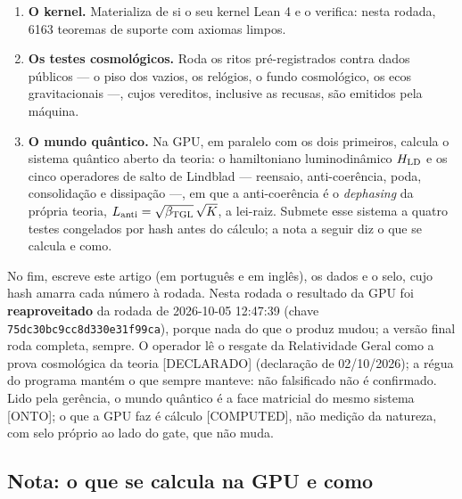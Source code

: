 \documentclass[11pt]{article}
\newcommand{\bTGL}{\beta_{\mathrm{TGL}}}\newcommand{\Msun}{M_{\odot}}\newcommand{\TGL}{\mathrm{TGL}}
\theoremstyle{definition}\newtheorem{deriv}{Derivação}
\begin{document}
\begin{enumerate}

\item \textbf{O kernel.} Materializa de si o seu kernel Lean 4 e o verifica: nesta rodada, 6163 teoremas de suporte com axiomas limpos.

\item \textbf{Os testes cosmológicos.} Roda os ritos pré-registrados contra dados públicos --- o piso dos vazios, os relógios, o fundo cosmológico, os ecos gravitacionais ---, cujos vereditos, inclusive as recusas, são emitidos pela máquina.

\item \textbf{O mundo quântico.} Na GPU, em paralelo com os dois primeiros, calcula o sistema quântico aberto da teoria: o hamiltoniano luminodinâmico $H_{\rm LD}$ e os cinco operadores de salto de Lindblad --- reensaio, anti-coerência, poda, consolidação e dissipação ---, em que a anti-coerência é o \emph{dephasing} da própria teoria, $L_{\rm anti}=\sqrt{\bTGL}\,\sqrt K$, a lei-raiz. Submete esse sistema a quatro testes congelados por hash antes do cálculo; a nota a seguir diz o que se calcula e como.

\end{enumerate}

No fim, escreve este artigo (em português e em inglês), os dados e o selo, cujo hash amarra cada número à rodada. Nesta rodada o resultado da GPU foi \textbf{reaproveitado} da rodada de 2026-10-05 12:47:39 (chave \texttt{75dc30bc9cc8d330e31f99ca}), porque nada do que o produz mudou; a versão final roda completa, sempre. O operador lê o resgate da Relatividade Geral como a prova cosmológica da teoria \textsf{[DECLARADO]} (declaração de 02/10/2026); a régua do programa mantém o que sempre manteve: não falsificado não é confirmado. Lido pela gerência, o mundo quântico é a face matricial do mesmo sistema \textsf{[ONTO]}; o que a GPU faz é cálculo \textsf{[COMPUTED]}, não medição da natureza, com selo próprio ao lado do gate, que não muda.

\subsection*{Nota: o que se calcula na GPU e como}

\end{document}
